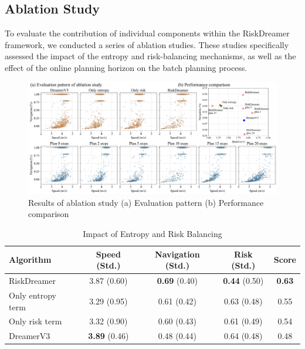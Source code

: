\subsection{Ablation Study}


To evaluate the contribution of individual components within the RiskDreamer framework, we conducted a series of ablation studies. These studies specifically assessed the impact of the entropy and risk-balancing mechanisms, as well as the effect of the online planning horizon on the batch planning process.



\begin{figure}[!htbp]
    \centering
    \includegraphics[width=\textwidth]{fig/abafig.png}
    \caption{Results of ablation study (a) Evaluation pattern (b) Performance comparison}
    \label{fig:aba_fig}
\end{figure}

\begin{table}[!ht]
    \caption{Impact of Entropy and Risk Balancing}
    \label{table:ablation_entropy_risk}
    \centering
    \begin{tabular}{lcccc}
    \toprule
    Algorithm & Speed (Std.) & Navigation (Std.) & Risk (Std.) & Score \\
    \midrule
    \rowcolor{lightgray} RiskDreamer & 3.87 (0.60) & \textbf{0.69} (0.40) & \textbf{0.44} (0.50) & \textbf{0.63} \\
    Only entropy term & 3.29 (0.95) & 0.61 (0.42) & 0.63 (0.48) & 0.55 \\
    Only risk term & 3.32 (0.90) & 0.60 (0.43) & 0.61 (0.49) & 0.54 \\
    DreamerV3 & \textbf{3.89} (0.46) & 0.48 (0.44) & 0.64 (0.48) & 0.48 \\
    \bottomrule
    \end{tabular}
\end{table}




